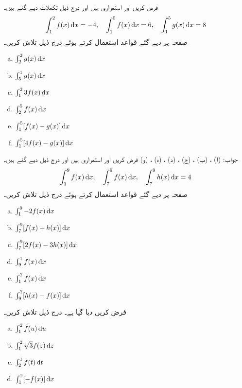 فرض کریں  اور  استمراری ہیں اور درج ذیل تکملات دیے گئے ہیں۔
\begin{align*}
\int_1^2f(x)\dif x=-4,\quad \int_1^5f(x)\dif x=6,\quad \int_1^5g(x)\dif x=8
\end{align*}
صفحہ  پر دیے گئے قواعد استعمال کرتے ہوئے درج ذیل تلاش کریں۔
\begin{multicols}{3}
\begin{enumerate}[a.]
\item
$\int_2^2g(x)\dif x$
\item
$\int_5^1g(x)\dif x$
\item
$\int_1^23f(x)\dif x$
\item
$\int_2^5f(x)\dif x$
\item
$\int_1^5[f(x)-g(x)]\dif x$
\item
$\int_1^5[4f(x)-g(x)]\dif x$
\end{enumerate}
\end{multicols}
جواب:\quad
(ا) ، (ب) ، (ج) ، (د) ، (ہ) ، (و) 
فرض کریں  اور  استمراری ہیں اور درج ذیل دیے گئے ہیں۔
\begin{align*}
\int_1^9f(x)\dif x,\quad \int_7^9f(x)\dif x,\quad \int_7^9h(x)\dif x=4
\end{align*}
صفحہ  پر دیے گئے قواعد استعمال کرتے ہوئے درج ذیل تلاش کریں۔
\begin{multicols}{3}
\begin{enumerate}[a.]
\item
$\int_1^9-2f(x)\dif x$
\item
$\int_7^9[f(x)+h(x)]\dif x$
\item
$\int_7^9[2f(x)-3h(x)]\dif x$
\item
$\int_9^1f(x)\dif x$
\item
$\int_1^7f(x)\dif x$
\item
$\int_9^7[h(x)-f(x)]\dif x$
\end{enumerate}
\end{multicols}
فرض کریں  دیا گیا ہے۔ درج ذیل تلاش کریں۔
\begin{multicols}{3}
\begin{enumerate}[a.]
\item
$\int_1^2f(u)\dif u$
\item
$\int_1^2\sqrt{3}f(z)\dif z$
\item
$\int_2^1f(t)\dif t$
\item
$\int_1^2[-f(x)]\dif x$
\end{enumerate}
\end{multicols}
